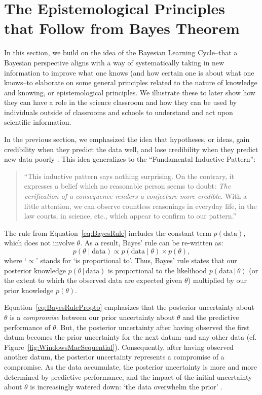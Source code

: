 \documentclass[man]{apa7}
\newcommand{\given}{\, | \,}
\begin{document}
\section{The Epistemological Principles that Follow from Bayes Theorem}

In this section, we build on the idea of the Bayesian Learning Cycle--that a Bayesian perspective aligns with a way of systematically taking in new information to improve what one knows (and how certain one is about what one knows--to elaborate on some general principles related to the nature of knowledge and knowing, or epistemological principles. We illustrate these to later show how they can have a role in the science classroom and how they can be used by individuals outside of classrooms and schools to understand and act upon scientific information.

In the previous section, we emphasized the idea that hypotheses, or ideas, gain credibility when they predict the data well, and lose credibility when they predict new data poorly \parencite{WagenmakersEtAl2016CD}. This idea generalizes to the ``Fundamental Inductive Pattern'':
\begin{quotation}

\noindent ``This inductive pattern says nothing surprising. On the contrary, it expresses a belief which no reasonable person seems to doubt: \emph{The verification of a consequence renders a conjecture more credible}. With a little attention, we can observe countless reasonings in everyday life, in the law courts, in science, etc., which appear to confirm to our pattern.'' \parencite[pp. 4-5]{Polya1954Vol2}
\end{quotation}

The rule from Equation~\ref{eq:BayesRule} includes the constant term $p(\text{data})$, which does not involve $\theta$. As a result, Bayes' rule can be re-written as:
\begin{equation}
\label{eq:BayesRulePropto}
p(\theta \mid \text{data}) \propto p(\text{data} \mid \theta) \times p(\theta),
\end{equation}
where `$\propto$' stands for `is proportional to'. Thus, Bayes' rule states that our posterior knowledge $p(\theta \given \text{data})$ is proportional to the likelihood $p(\text{data} \given \theta)$ (or the extent to which the observed data are expected given $\theta$) multiplied by our prior knowledge $p(\theta)$.

Equation~\ref{eq:BayesRulePropto} emphasizes that the posterior uncertainty about $\theta$ is a \emph{compromise} between our prior uncertainty about $\theta$ and the predictive performance of $\theta$. But, the posterior uncertainty after having observed the first datum becomes the prior uncertainty for the next datum--and any other data (cf. Figure~\ref{fig:WindowsMacSequential}). Consequently, after having observed another datum, the posterior uncertainty represents a compromise of a compromise. As the data accumulate, the posterior uncertainty is more and more determined by predictive performance, and the impact of the initial uncertainty about $\theta$ is increasingly watered down: `the data overwhelm the prior' \parencite{WrinchJeffreys1919}.
\end{document}
